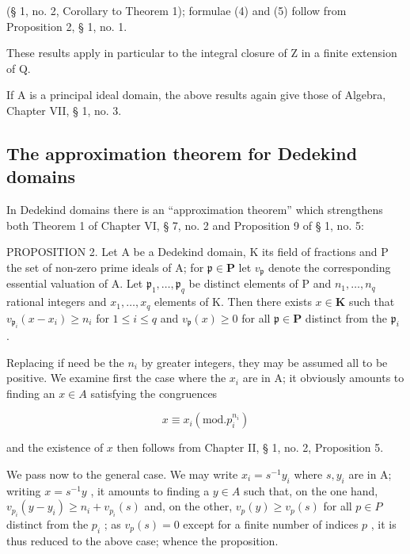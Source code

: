 (§ 1, no. 2, Corollary to Theorem 1); formulae (4) and (5) follow from Proposition 2, § 1, no. 1.

These results apply in particular to the integral closure of Z in a finite extension of Q.

If A is a principal ideal domain, the above results again give those of Algebra, Chapter VII, § 1, no. 3.

\subsection{The approximation theorem for Dedekind domains}

In Dedekind domains there is an ``approximation theorem'' which strengthens both Theorem 1 of Chapter VI, § 7, no. 2 and Proposition 9 of § 1, no. 5:

PROPOSITION 2. Let A be a Dedekind domain, K its field of fractions and P the set of non-zero prime ideals of A; for \(\mathfrak{p} \in \mathbf{P}\) let \(v_{\mathfrak{p}}\) denote the corresponding essential valuation of A. Let \(\mathfrak{p}_1, \ldots, \mathfrak{p}_q\) be distinct elements of P and \(n_1, \ldots, n_q\) rational integers and \(x_1, \ldots, x_q\) elements of K. Then there exists \(x \in \mathbf{K}\) such that \(v_{\mathfrak{p}_i}(x - x_i) \geqslant n_i\) for \(1 \leqslant i \leqslant q\) and \(v_{\mathfrak{p}}(x) \geqslant 0\) for all \(\mathfrak{p} \in \mathbf{P}\) distinct from the \(\mathfrak{p}_i\) .

Replacing if need be the \(n_{i}\) by greater integers, they may be assumed all to be positive. We examine first the case where the \(x_{i}\) are in A; it obviously amounts to finding an \(x \in A\) satisfying the congruences

\[
x \equiv x _ {i} (\mathrm{mod.} p _ {i} ^ {n _ {i}})
\]

and the existence of \(x\) then follows from Chapter II, § 1, no. 2, Proposition 5.

We pass now to the general case. We may write \(x_{i} = s^{-1}y_{i}\) where \(s, y_{i}\) are in A; writing \(x = s^{-1}y\) , it amounts to finding a \(y \in A\) such that, on the one hand, \(v_{p_i}(y - y_i) \geqslant n_i + v_{p_i}(s)\) and, on the other, \(v_{p}(y) \geqslant v_{p}(s)\) for all \(p \in P\) distinct from the \(p_i\) ; as \(v_{p}(s) = 0\) except for a finite number of indices \(p\) , it is thus reduced to the above case; whence the proposition.

